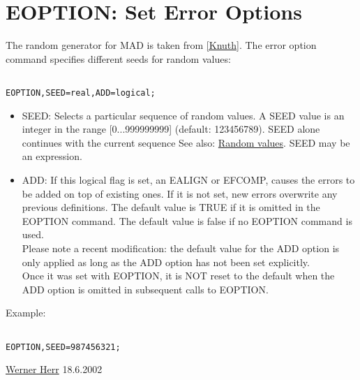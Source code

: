 




\section{EOPTION: Set Error Options}  The random generator for MAD is taken from \href{../Introduction/bibliography.html#knuth}{[Knuth]}. The error option command specifies different seeds for random values: 
\begin{verbatim}

EOPTION,SEED=real,ADD=logical;
\end{verbatim}
\begin{itemize}
	\item SEED: Selects a particular sequence of random values. A SEED value is an integer in the range [0...999999999] (default: 123456789). SEED alone continues with the current sequence See also: \href{../Introduction/expression.html#random}{Random values}. SEED may be an expression. 
	\item ADD: If this logical flag is set, an EALIGN or EFCOMP, causes the errors to be added on top of existing ones. If it is not set, new errors overwrite any previous definitions. The default value is TRUE if it is omitted in the EOPTION command. The default value is false if no EOPTION command is used. 
\\Please note a recent modification: the default value for the ADD option is only applied as long as the ADD option has not been set explicitly.
\\ Once it was set with EOPTION, it is NOT reset to the default when       the ADD option is omitted in subsequent calls to EOPTION. 
\end{itemize} Example: 
\begin{verbatim}

EOPTION,SEED=987456321;
\end{verbatim}\href{http://consult.cern.ch/xwho/people/1808}{Werner Herr} 18.6.2002 

